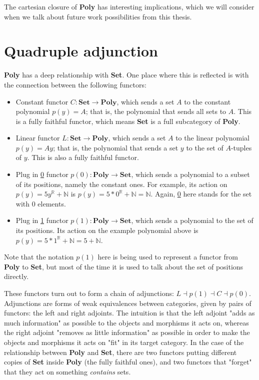 The cartesian closure of \textbf{Poly} has interesting implications, which we will consider when we talk about future work possibilities from this thesis.

\section{Quadruple adjunction}

\textbf{Poly} has a deep relationship with \textbf{Set}. One place where this is reflected is with the connection between the following functors:

\begin{itemize}
    \item Constant functor $C : \textbf{Set} \rightarrow \textbf{Poly}$, which sends a set $A$ to the constant polynomial $p(y) = A$; that is, the polynomial that sends all sets to $A$. This is a fully faithful functor, which means \textbf{Set} is a full subcategory of \textbf{Poly}.
    \item Linear functor $L : \textbf{Set} \rightarrow \textbf{Poly}$,  which sends a set $A$ to the linear polynomial $p(y) = Ay$; that is, the polynomial that sends a set $y$ to the set of $A$-tuples of $y$. This is also a fully faithful functor.
    \item Plug in \underline{0} functor $p(0) : \textbf{Poly} \rightarrow \textbf{Set}$, which sends a polynomial to a subset of its positions, namely the constant ones. For example, its action on $p(y) = 5y^{\mathbb{R}} + \mathbb{N}$ is $p(y) = 5*0^{\mathbb{R}} + \mathbb{N} = \mathbb{N}$. Again, \underline{0} here stands for the set with 0 elements.
    \item Plug in \underline{1} functor $p(1) : \textbf{Poly} \rightarrow \textbf{Set}$, which sends a polynomial to the set of its positions. Its action on the example polynomial above is $p(y) = 5*1^{\mathbb{R}} + \mathbb{N} = 5 + \mathbb{N}$.
\end{itemize}

Note that the notation $p(1)$ here is being used to represent a functor from \textbf{Poly} to \textbf{Set}, but most of the time it is used to talk about the set of positions directly.

These functors turn out to form a chain of adjunctions: $L \dashv p(1) \dashv C \dashv p(0)$. Adjunctions are forms of weak equivalences between categories, given by pairs of functors: the left and right adjoints. The intuition is that the left adjoint "adds as much information" as possible to the objects and morphisms it acts on, whereas the right adjoint "removes as little information" as possible in order to make the objects and morphisms it acts on "fit" in its target category. In the case of the relationship between \textbf{Poly} and \textbf{Set}, there are two functors putting different copies of \textbf{Set} inside \textbf{Poly} (the fully faithful ones), and two functors that "forget" that they act on something \textit{contains} sets. 

